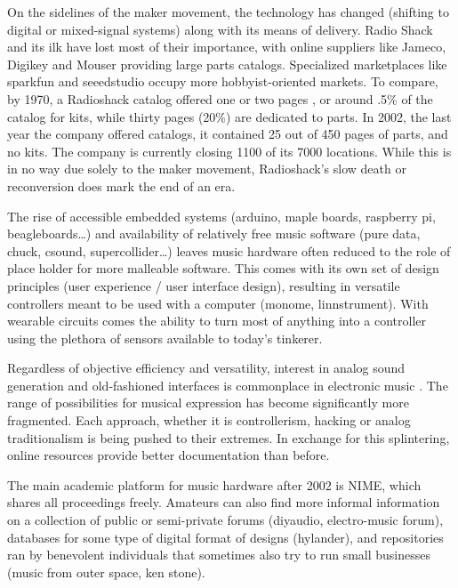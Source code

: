 \begin{itemize}
On the sidelines of the maker movement, the technology has changed (shifting to digital or mixed-signal systems) along with its means of delivery. Radio Shack and its ilk have lost most of their importance, with online suppliers like Jameco, Digikey and Mouser providing large parts catalogs. Specialized marketplaces like sparkfun and seeedstudio occupy more hobbyist-oriented markets. To compare, by 1970, a Radioshack catalog offered one or two pages , or around .5\% of the catalog for kits, while thirty pages (20\%) are dedicated to parts. In 2002, the last year the company offered catalogs, it contained 25 out of 450 pages of parts, and no kits. The company is currently closing 1100 of its 7000 locations. While this is in no way due solely to the maker movement, Radioshack’s slow death or reconversion does mark the end of an era. 

The rise of accessible embedded systems (arduino, maple boards, raspberry pi, beagleboards…) and availability of relatively free music software (pure data, chuck, csound, supercollider…) leaves music hardware often reduced to the role of place holder for more malleable software. This comes with its own set of design principles (user experience / user interface design), resulting in versatile controllers meant to be used with a computer (monome, linnstrument). With wearable circuits comes the ability to turn most of anything into a controller using the plethora of sensors available to today’s tinkerer. 

Regardless of objective efficiency and versatility, interest in analog sound generation and old-fashioned interfaces is commonplace in electronic music \cite{collins2006}. The range of possibilities for musical expression has become significantly more fragmented. Each approach, whether it is controllerism, hacking or analog traditionalism is being pushed to their extremes. In exchange for this splintering, online resources provide better documentation than before.

The main academic platform for music hardware after 2002 is NIME, which shares all proceedings freely. Amateurs can also find more informal information on a collection of public or semi-private forums (diyaudio, electro-music forum), databases for some type of digital format of designs (hylander), and repositories ran by benevolent individuals that sometimes also try to run small businesses (music from outer space, ken stone).


\end{itemize}

